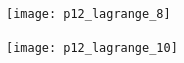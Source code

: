 \begin{frame}
    \begin{solution}
        \begin{figure}[ht!]
            \centering
            \texttt{[image: p12\_lagrange\_8]}
        \end{figure}
    \end{solution}
\end{frame}

\begin{frame}
    \begin{solution}
        \begin{figure}[ht!]
            \centering
            \texttt{[image: p12\_lagrange\_10]}
        \end{figure}
    \end{solution}
\end{frame}